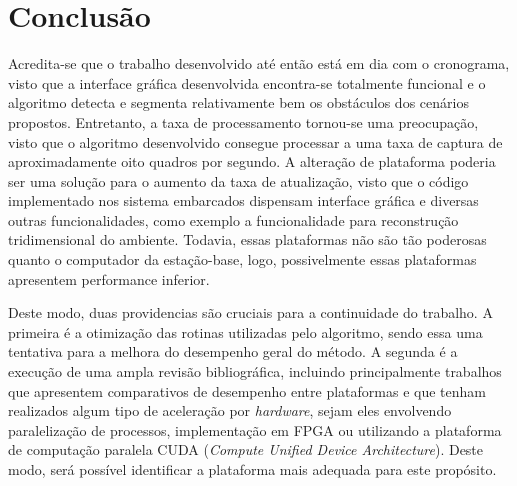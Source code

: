 \chapter{Conclusão}
\label{Conclusao}

Acredita-se que o trabalho desenvolvido até então está em dia com o cronograma, visto que a interface gráfica desenvolvida encontra-se totalmente funcional e o algoritmo detecta e segmenta relativamente bem os obstáculos dos cenários propostos. Entretanto, a taxa de processamento tornou-se uma preocupação, visto que o algoritmo desenvolvido consegue processar a uma taxa de captura de aproximadamente oito quadros por segundo. A alteração de plataforma poderia ser uma solução para o aumento da taxa de atualização, visto que o código implementado nos sistema embarcados dispensam interface gráfica e diversas outras funcionalidades, como exemplo a funcionalidade para reconstrução tridimensional do ambiente. Todavia, essas plataformas não são tão poderosas quanto o computador da estação-base, logo, possivelmente essas plataformas apresentem performance inferior.

Deste modo, duas providencias  são cruciais para a continuidade do trabalho. A primeira é a otimização das rotinas utilizadas pelo algoritmo, sendo essa uma tentativa para a melhora do desempenho geral do método. A segunda é a execução de uma ampla revisão bibliográfica, incluindo principalmente trabalhos que apresentem comparativos de desempenho entre plataformas e que tenham realizados algum tipo de aceleração por \textit{hardware}, sejam eles envolvendo paralelização de processos, implementação em FPGA ou utilizando a plataforma de computação paralela CUDA (\textit{Compute Unified Device Architecture}). Deste modo, será possível identificar a plataforma mais adequada para este propósito. 

